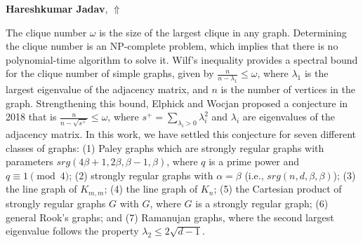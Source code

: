 \documentclass[ILAS2025-program.tex]{subfiles}
\begin{document}
\hypertarget{down0089}{}\begin{ilasabstract}
    
\textbf{Hareshkumar Jadav},  \hfill \hyperlink{up0089}{$\Uparrow$}
    
    
\mtskip
    The clique number $\omega$ is the size of the largest clique in any graph. Determining the clique number is an NP-complete problem, which implies that there is no polynomial-time algorithm to solve it. Wilf's inequality provides a spectral bound for the clique number of simple graphs, given by $\frac{n}{n - \lambda_{1}} \leq \omega$, where $\lambda_1$ is the largest eigenvalue of the adjacency matrix, and $n$ is the number of vertices in the graph. Strengthening this bound, Elphick and Wocjan proposed a conjecture in 2018 that is $\frac{n}{n - \sqrt{s^{+}}} \leq \omega$, where $s^+ = \sum_{\lambda_{i} > 0} \lambda_{i}^2$ and $\lambda_i$ are eigenvalues of the adjacency matrix. In this work, we have settled this conjecture for seven different classes of graphs: (1) Paley graphs which are strongly regular graphs with parameters $srg(4\beta + 1, 2\beta, \beta - 1, \beta)$, where $q$ is a prime power and $q \equiv 1 \pmod{4}$; (2) strongly regular graphs with $\alpha = \beta$ (i.e., $srg(n, d, \beta, \beta)$); (3) the line graph of $K_{m,m}$; (4) the line graph of $K_{n}$; (5) the Cartesian product of strongly regular graphs $G$ with $G$, where $G$ is a strongly regular graph; (6) general Rook's graphs; and (7) Ramanujan graphs, where the second largest eigenvalue follows the property $\lambda_2 \leq 2\sqrt{d-1}$.
\end{ilasabstract}
    
\end{document}
